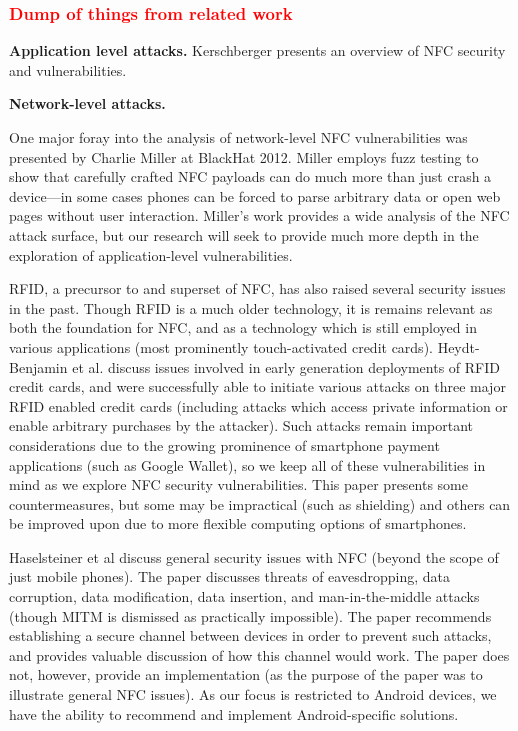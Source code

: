\documentclass[12pt]{article}
\newcommand\TODO[1]{\textcolor{red}{#1}}
\begin{document}
\subsubsection{ \TODO{Dump of things from related work}}
\textbf{Application level attacks.}
Kerschberger\cite{kerschberger2011} presents an overview of NFC security and vulnerabilities.


\textbf{Network-level attacks.}

One major foray into the analysis of network-level NFC vulnerabilities was presented by Charlie Miller at BlackHat 2012\cite{miller2012}.
Miller employs fuzz testing to show that carefully crafted NFC payloads can do much more than just crash a device---in some cases phones can be forced to parse arbitrary data or open web pages without user interaction.
Miller's work provides a wide analysis of the NFC attack surface, but our research will seek to provide much more depth in the exploration of application-level vulnerabilities.

RFID, a precursor to and superset of NFC, has also raised several security issues in the past.
Though RFID is a much older technology, it is remains relevant as both the foundation for NFC, and as a technology which is still employed in various applications (most prominently touch-activated credit cards).
Heydt-Benjamin et al.\cite{heydtbenjamin2007} discuss issues involved in early generation deployments of RFID credit cards, and were successfully able to initiate various attacks on three major RFID enabled credit cards (including attacks which access private information or enable arbitrary purchases by the attacker).
Such attacks remain important considerations due to the growing prominence of smartphone payment applications  (such as Google Wallet), so we keep all of these vulnerabilities in mind as we explore NFC security vulnerabilities.
This paper presents some countermeasures, but some may be impractical (such as shielding) and others can be improved upon due to more flexible computing options of smartphones.

Haselsteiner et al\cite{haselsteiner2006} discuss general security issues with NFC (beyond the scope of just mobile phones).
The paper discusses threats of eavesdropping, data corruption, data modification, data insertion, and man-in-the-middle attacks (though MITM is dismissed as practically impossible).
The paper recommends establishing a secure channel between devices in order to prevent such attacks, and provides valuable discussion of how this channel would work.
The paper does not, however, provide an implementation (as the purpose of the paper was to illustrate general NFC issues).
As our focus is restricted to Android devices, we have the ability to recommend and implement Android-specific solutions.
\end{document}
